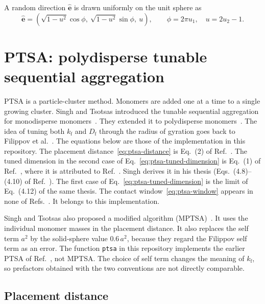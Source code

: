 \documentclass[11pt,a4paper]{article}
\newcommand{\Df}{D_\text{f}}
\newcommand{\kf}{k_\text{f}}
\begin{document}
A random direction $\hat{\bm{e}}$ is drawn uniformly on the unit sphere as
\begin{equation}
  \hat{\bm{e}} = \left( \sqrt{1-u^2}\cos\phi,\ \sqrt{1-u^2}\sin\phi,\ u \right), \qquad
  \phi = 2\pi u_1, \quad u = 2u_2 - 1 .
  \label{eq:random-direction}
\end{equation}

\section{PTSA: polydisperse tunable sequential aggregation}
\label{sec:ptsa}

PTSA is a particle-cluster method.
Monomers are added one at a time to a single growing cluster.
Singh and Tsotsas introduced the tunable sequential aggregation for monodisperse monomers~\cite{singh2020}.
They extended it to polydisperse monomers~\cite{singh2021,singh2022}.
The idea of tuning both $\kf$ and $\Df$ through the radius of gyration goes back to Filippov et al.~\cite{filippov2000}.
The equations below are those of the implementation in this repository.
The placement distance~\eqref{eq:ptsa-distance} is Eq.~(2) of Ref.~\cite{singh2022}.
The tuned dimension in the second case of Eq.~\eqref{eq:ptsa-tuned-dimension} is Eq.~(1) of Ref.~\cite{singh2022}, where it is attributed to Ref.~\cite{singh2020}.
Singh derives it in his thesis (Eqs.~(4.8)--(4.10) of Ref.~\cite{singh2021thesis}).
The first case of Eq.~\eqref{eq:ptsa-tuned-dimension} is the limit of Eq.~(4.12) of the same thesis.
The contact window~\eqref{eq:ptsa-window} appears in none of Refs.~\cite{singh2021,singh2021thesis,singh2022}.
It belongs to this implementation.

Singh and Tsotsas also proposed a modified algorithm (MPTSA)~\cite{singh2021}.
It uses the individual monomer masses in the placement distance.
It also replaces the self term $a^2$ by the solid-sphere value $0.6\,a^2$, because they regard the Filippov self term as an error.
The function \texttt{ptsa} in this repository implements the earlier PTSA of Ref.~\cite{singh2022}, not MPTSA.
The choice of self term changes the meaning of $\kf$, so prefactors obtained with the two conventions are not directly comparable.

\subsection{Placement distance}
\label{sec:ptsa-distance}
\end{document}
